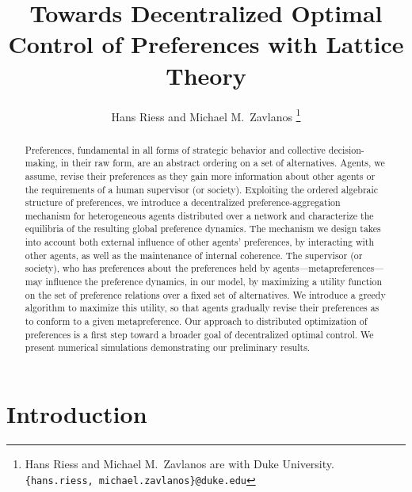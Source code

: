 \documentclass[conference]{ieeeconf}
\begin{document}
\title{\bf Towards Decentralized Optimal Control of Preferences with Lattice Theory}

\author{Hans Riess and Michael M.~Zavlanos%
\thanks{Hans Riess and Michael M.~Zavlanos are with Duke University.
        {\tt\small \{hans.riess, michael.zavlanos\}@duke.edu}}%
}
\maketitle

\begin{abstract}
Preferences, fundamental in all forms of strategic behavior and collective decision-making, in their raw form, are an abstract ordering on a set of alternatives. Agents, we assume, revise their preferences as they gain more information about other agents or the requirements of a human supervisor (or society). Exploiting the ordered algebraic structure of preferences,  we introduce a decentralized preference-aggregation mechanism for heterogeneous agents distributed over a network and characterize the equilibria of the resulting global preference dynamics. The mechanism we design takes into account both external influence of other agents' preferences, by interacting with other agents, as well as the maintenance of internal coherence. The supervisor (or society), who has preferences about the preferences held by agents---metapreferences---may influence the preference dynamics, in our model, by maximizing a utility function on the set of preference relations over a fixed set of alternatives. We introduce a greedy algorithm to maximize this utility, so that agents gradually revise their preferences as to conform to a given metapreference. Our approach to distributed optimization of preferences is a first step toward a broader goal of decentralized optimal control. We present numerical simulations demonstrating our preliminary results.
\end{abstract}


\section{Introduction}
\end{document}
